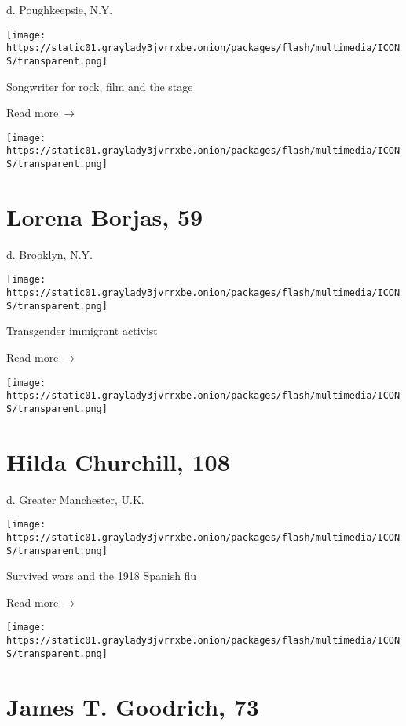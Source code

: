 d. Poughkeepsie, N.Y.

\texttt{[image: https://static01.graylady3jvrrxbe.onion/packages/flash/multimedia/ICONS/transparent.png]}

Songwriter for rock, film and the stage

 Read more~→

\href{https://www.nytimes3xbfgragh.onion/2020/04/01/obituaries/lorena-borjas-dead-coronavirus.html}{}

\texttt{[image: https://static01.graylady3jvrrxbe.onion/packages/flash/multimedia/ICONS/transparent.png]}

\hypertarget{lorena-borjas-59}{%
\section{Lorena Borjas, 59}\label{lorena-borjas-59}}

d. Brooklyn, N.Y.

\texttt{[image: https://static01.graylady3jvrrxbe.onion/packages/flash/multimedia/ICONS/transparent.png]}

Transgender immigrant activist

 Read more~→

\href{https://www.nytimes3xbfgragh.onion/2020/04/01/obituaries/hilda-churchill-dead-coronavirus.html}{}

\texttt{[image: https://static01.graylady3jvrrxbe.onion/packages/flash/multimedia/ICONS/transparent.png]}

\hypertarget{hilda-churchill-108}{%
\section{Hilda Churchill, 108}\label{hilda-churchill-108}}

d. Greater Manchester, U.K.

\texttt{[image: https://static01.graylady3jvrrxbe.onion/packages/flash/multimedia/ICONS/transparent.png]}

Survived wars and the 1918 Spanish flu

 Read more~→

\href{https://www.nytimes3xbfgragh.onion/2020/04/01/obituaries/dr-james-t-goodrich-dead-coronavirus.html}{}

\texttt{[image: https://static01.graylady3jvrrxbe.onion/packages/flash/multimedia/ICONS/transparent.png]}

\hypertarget{james-t-goodrich-73}{%
\section{James T. Goodrich, 73}\label{james-t-goodrich-73}}

